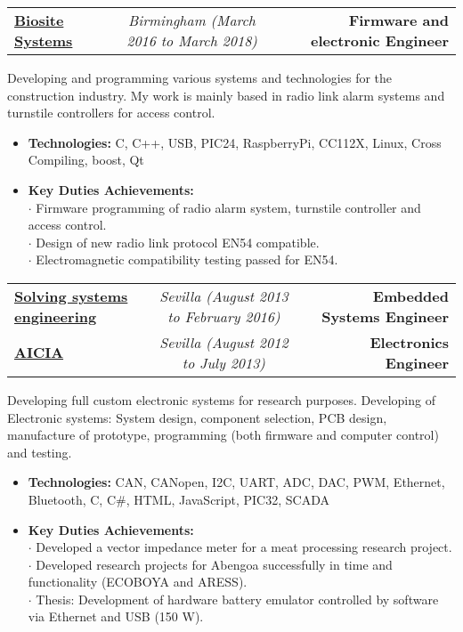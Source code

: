 \documentclass[9pt]{extarticle}
\begin{document}
\par
\begin{table}[H]
\begin{tabularx}{\textwidth}{lcXr}
\textbf{\href{http://www.biositesystems.com/}{Biosite Systems}} & \emph{Birmingham (March 2016 to March 2018)} & & \textbf{Firmware and electronic Engineer}
\end{tabularx}
\end{table}
\par
\hspace{20pt}Developing and programming various systems and technologies for the construction industry. 
My work is mainly based in radio link alarm systems and turnstile controllers for access control. 
\begin{itemize}
    \item{\textbf{Technologies:} C, C++, USB, PIC24, RaspberryPi, CC112X, Linux, Cross Compiling, boost, Qt}
    \item{\textbf{Key Duties Achievements:}}
\\$\cdot$ Firmware programming of radio alarm system, turnstile controller and access control.
\\$\cdot$ Design of new radio link protocol EN54 compatible.
\\$\cdot$ Electromagnetic compatibility testing passed for EN54.
\end{itemize}

\begin{table}[H]
\begin{tabularx}{\textwidth}{lcXr}
\textbf{\href{http://www.s2e.es/en}{Solving systems engineering}} & \emph{Sevilla (August 2013 to February 2016)} & & \textbf{Embedded Systems Engineer}\\
\textbf{\href{http://aicia.es/en}{AICIA}}     & \emph{Sevilla (August 2012 to July 2013)} & & \textbf{Electronics Engineer}
\end{tabularx}
\end{table}
\par
\hspace{20pt}Developing full custom electronic systems for research purposes. 
\hspace{20pt}Developing of Electronic systems: System design, component selection, PCB design, 
manufacture of prototype, programming (both firmware and computer control) and testing. 
\begin{itemize}
    \item{\textbf{Technologies:} CAN, CANopen, I2C, UART, ADC, DAC, PWM, Ethernet, Bluetooth, C, C\#, HTML, JavaScript, PIC32, SCADA}
    \item{\textbf{Key Duties Achievements:}}
\\$\cdot$ Developed a vector impedance meter for a meat processing research project.
\\$\cdot$ Developed research projects for Abengoa successfully in time and functionality (ECOBOYA and ARESS).
\\$\cdot$ Thesis: Development of hardware battery emulator controlled by software via Ethernet and USB (150 W).
\end{itemize}
\end{document}
